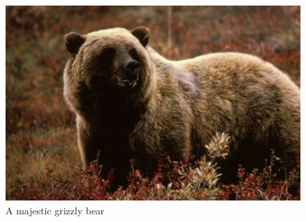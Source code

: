 \documentclass[10pt, a4paper, twocolumn]{article} %
\begin{document}
\begin{figure}
	\includegraphics[width=\linewidth]{bear.jpg} %
	\caption{A majestic grizzly bear} %
	\label{bear} %
\end{figure}
\end{document}
